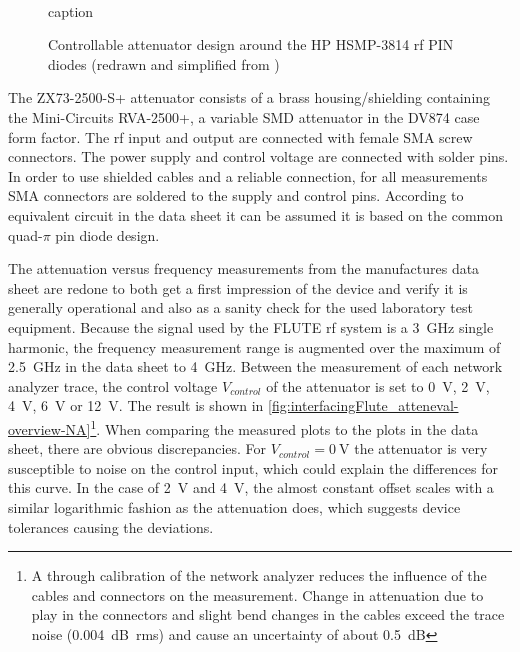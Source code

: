 \begin{figure}[tb]
    \centering
		\\
		\caption{caption}
    \label{fig:attenPhotoAndEquiC}
\end{figure}

\begin{figure}[tb]
    \centering
	
	\caption{Controllable attenuator design around the HP HSMP-3814 \gls{rf} PIN diodes (redrawn and simplified from \cite{waughLowCostSurfaceMount1992})}
    \label{fig:quadPiequiC}
\end{figure}




The ZX73-2500-S+ attenuator consists of a brass housing/shielding containing the Mini-Circuits RVA-2500+, a variable SMD attenuator in the DV874 case form factor. The \gls{rf} input and output are connected with female SMA screw connectors. The power supply and control voltage are connected with solder pins. In order to use shielded cables and a reliable connection, for all measurements SMA connectors are soldered to the supply and control pins. According to equivalent circuit in the data sheet\cite{mini-circuitsZX732500VoltageVariable} it can be assumed it is based on the common quad-$\pi$ pin diode design\cite{waughLowCostSurfaceMount1992}.

The attenuation versus frequency measurements from the manufactures data sheet are redone to both get a first impression of the device and verify it is generally operational and also as a sanity check for the used laboratory test equipment.
Because the signal used by the FLUTE \gls{rf} system is a \SI{3}{\GHz} single harmonic, the frequency measurement range is augmented over the maximum of \SI{2.5}{\GHz} in the data sheet to \SI{4}{\GHz}.
Between the measurement of each network analyzer trace, the control voltage $V_{control}$ of the attenuator is set to \SI{0}{\volt}, \SI{2}{\volt}, \SI{4}{\volt}, \SI{6}{\volt} or \SI{12}{\volt}.
The result is shown in \autoref{fig:interfacingFlute_atteneval-overview-NA}\footnote{A through calibration of the network analyzer reduces the influence of the cables and connectors on the measurement. Change in attenuation due to play in the connectors and slight bend changes in the cables exceed the trace noise (\SI{0.004}{\dB rms}) and cause an uncertainty of about \SI{0.5}{\dB}}.
When comparing the measured plots to the plots in the data sheet, there are obvious discrepancies. For $V_{control}=\SI{0}{\volt}$ the attenuator is very susceptible to noise on the control input, which could explain the differences for this curve. In the case of \SI{2}{\volt} and \SI{4}{\volt}, the almost constant offset scales with a similar logarithmic fashion as the attenuation does, which suggests device tolerances causing the deviations.

